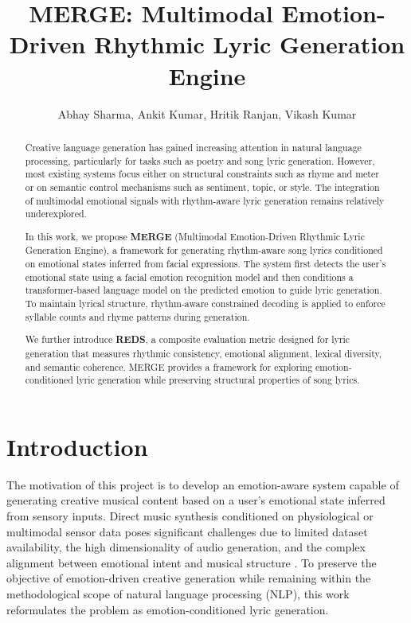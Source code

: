 \documentclass[11pt]{article}
\title{MERGE: Multimodal Emotion-Driven Rhythmic Lyric Generation Engine}
\author{Abhay Sharma, Ankit Kumar, Hritik Ranjan, Vikash Kumar}
\begin{document}
\maketitle


\begin{abstract}
Creative language generation has gained increasing attention in natural language processing, particularly for tasks such as poetry and song lyric generation. However, most existing systems focus either on structural constraints such as rhyme and meter or on semantic control mechanisms such as sentiment, topic, or style. The integration of multimodal emotional signals with rhythm-aware lyric generation remains relatively underexplored.

In this work, we propose \textbf{MERGE} (Multimodal Emotion-Driven Rhythmic Lyric Generation Engine), a framework for generating rhythm-aware song lyrics conditioned on emotional states inferred from facial expressions. The system first detects the user’s emotional state using a facial emotion recognition model and then conditions a transformer-based language model on the predicted emotion to guide lyric generation. To maintain lyrical structure, rhythm-aware constrained decoding is applied to enforce syllable counts and rhyme patterns during generation.

We further introduce \textbf{REDS}, a composite evaluation metric designed for lyric generation that measures rhythmic consistency, emotional alignment, lexical diversity, and semantic coherence. MERGE provides a framework for exploring emotion-conditioned lyric generation while preserving structural properties of song lyrics.\end{abstract}



\section{Introduction}

The motivation of this project is to develop an emotion-aware system capable of generating creative musical content based on a user's emotional state inferred from sensory inputs. Direct music synthesis conditioned on physiological or multimodal sensor data poses significant challenges due to limited dataset availability, the high dimensionality of audio generation, and the complex alignment between emotional intent and musical structure \cite{cao2022multi}. To preserve the objective of emotion-driven creative generation while remaining within the methodological scope of natural language processing (NLP), this work reformulates the problem as emotion-conditioned lyric generation.
\end{document}
